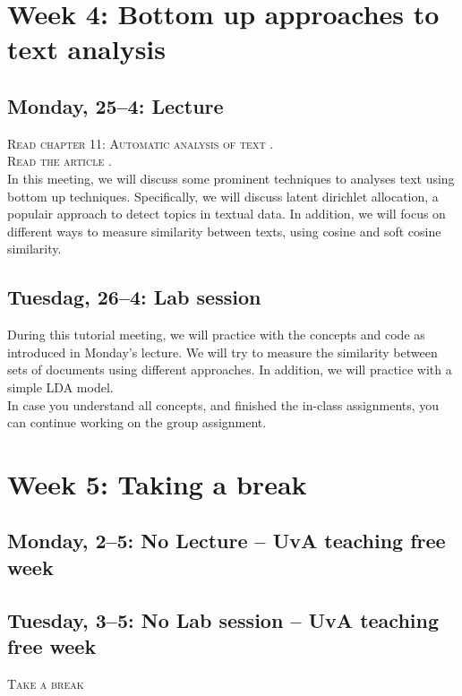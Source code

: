 \section*{Week 4: Bottom up approaches to text analysis}

\subsection*{Monday, 25--4: Lecture}
\textsc{Read chapter 11: Automatic analysis of text \cite{van2021computational}.} \\
\textsc{Read the article \cite{Brinberg2021}.} \\

In this meeting, we will discuss some prominent techniques to analyses text using bottom up techniques. Specifically, we will discuss latent dirichlet allocation, a populair approach to detect topics in textual data. In addition, we will focus on different ways to measure similarity between texts, using cosine and soft cosine similarity. 

\subsection*{Tuesdag, 26--4: Lab session}
During this tutorial meeting, we will practice with the concepts and code as introduced in Monday's lecture. We will try to measure the similarity between sets of documents using different approaches. In addition, we will practice with a simple LDA model. \\
In case you understand all concepts, and finished the in-class assignments, you can continue working on the group assignment. 

\section*{Week 5: Taking a break}

\subsection*{Monday, 2--5: No Lecture -- UvA teaching free week}

\subsection*{Tuesday, 3--5: No Lab session -- UvA teaching free week}

\textsc{ Take a break}\\

